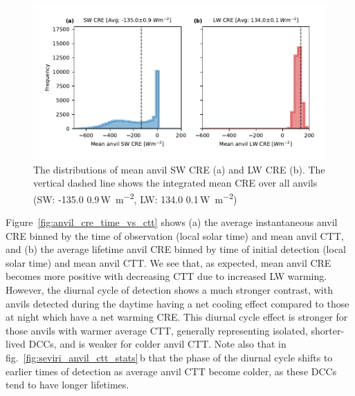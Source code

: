 \documentclass[acp, manuscript]{copernicus}
\begin{document}
\begin{figure}[tp]
    \includegraphics[width=12cm]{figures/fig12.pdf}
    \caption[
    The distributions of mean anvil SW CRE and LW CRE
    ]{
    The distributions of mean anvil SW CRE (a) and LW CRE (b). The vertical dashed line shows the integrated mean CRE over all anvils (SW: -135.0\,\textpm\,0.9\,\unit{W m^{-2}}, LW: 134.0\,\textpm\,0.1\,\unit{W m^{-2}})
    }
    \label{fig:anvil_sw_lw_cre}
\end{figure}


Figure~\ref{fig:anvil_cre_time_vs_ctt} shows (a) the average instantaneous anvil CRE binned by the time of observation (local solar time) and mean anvil CTT, and (b) the average lifetime anvil CRE binned by time of initial detection (local solar time) and mean anvil CTT.
We see that, as expected, mean anvil CRE becomes more positive with decreasing CTT due to increased LW warming. 
However, the diurnal cycle of detection shows a much stronger contrast, with anvils detected during the daytime having a net cooling effect compared to those at night which have a net warming CRE. 
This diurnal cycle effect is stronger for those anvils with warmer average CTT, generally representing isolated, shorter-lived DCCs, and is weaker for colder anvil CTT. 
Note also that in fig.~\ref{fig:seviri_anvil_ctt_stats}\,b that the phase of the diurnal cycle shifts to earlier times of detection as average anvil CTT become colder, as these DCCs tend to have longer lifetimes.
\end{document}
